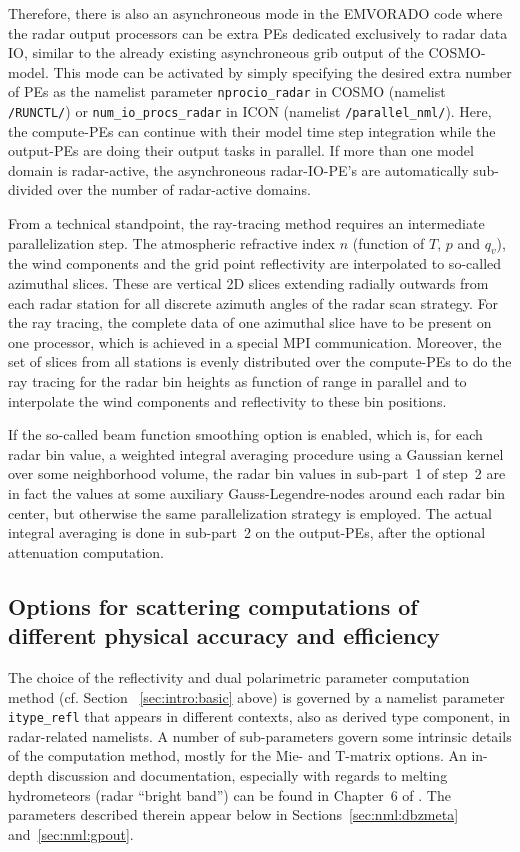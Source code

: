 \documentclass[10pt,a4paper,twoside,headinclude,footinclude,parskip=half]{scrartcl}
\newcommand{\myaktuellesection}{sec:intro}%
\newcommand{\labelsec}[1]{\label{#1}\renewcommand{\myaktuellesection}{#1}}%
\newcommand{\labelsec}[1]{\label{#1}}%
\newcommand{\citeP}[1]{\citet{#1}}
\newcommand{\srcform}[1]{\mbox{\texttt{#1}}\xspace}%
\begin{document}
Therefore, there is also an asynchroneous mode in the EMVORADO code where the radar output processors can
be extra PEs dedicated exclusively to radar data IO, similar to the already existing asynchroneous
grib output of the COSMO-model. This mode can be activated by simply specifying the desired extra number
of PEs as the namelist parameter \srcform{nprocio_radar} in COSMO (namelist \srcform{/RUNCTL/}) or \srcform{num_io_procs_radar} in ICON (namelist \srcform{/parallel_nml/}).
Here, the compute-PEs can continue with their model time step integration while
the output-PEs are doing their output tasks in parallel.
If more than one model domain is radar-active, the asynchroneous radar-IO-PE's are automatically sub-divided
over the number of radar-active domains.


From a technical standpoint, the ray-tracing method requires an intermediate parallelization step. The atmospheric
refractive index $n$ (function of $T$, $p$ and $q_v$), the wind components and the grid point reflectivity
are interpolated to so-called azimuthal slices. These are vertical 2D slices extending
radially outwards from each radar station for all discrete azimuth angles of the radar scan strategy. For the ray tracing,
the complete data of one azimuthal slice have to be present on one processor, which is achieved in a special MPI communication. Moreover,
the set of slices from all stations is evenly distributed over the compute-PEs to do the ray tracing for the radar bin heights as function of range in parallel and to interpolate the
wind components and reflectivity to these bin positions. 

If the so-called beam function smoothing option is enabled, which is, for each radar bin value, a weighted integral averaging procedure using
a Gaussian kernel over some neighborhood volume, the radar bin values in sub-part~1 of step~2 are in fact the values at
some auxiliary Gauss-Legendre-nodes around each radar bin center, but otherwise the same parallelization strategy is employed.
The actual integral averaging is done in sub-part~2 on the output-PEs, after the optional attenuation computation.


\subsection{Options for scattering computations of different physical accuracy and efficiency}
\labelsec{sec:intro:dbz}

The choice of the reflectivity and dual polarimetric parameter computation method (cf. Section ~\ref{sec:intro:basic} above) is governed by a namelist parameter \srcform{itype_refl} that appears
in different contexts, also as derived type component, in radar-related namelists.
A number of sub-parameters govern some intrinsic details of the computation method, mostly for the Mie- and T-matrix options.
An in-depth discussion and documentation, especially with regards to melting hydrometeors (radar ``bright band'') can be found in 
Chapter~6 of \citeP{blahak2016a}. The parameters described therein appear below in Sections~\ref{sec:nml:dbzmeta} and~\ref{sec:nml:gpout}.
\end{document}

